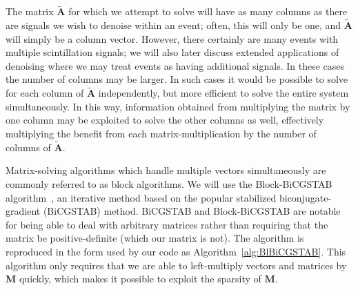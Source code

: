 The matrix $\mathbf{\widetilde{A}}$ for which we attempt to solve will have as many columns as there are signals we wish to denoise within an event; often, this will only be one, and $\mathbf{\widetilde{A}}$ will simply be a column vector.  However, there certainly are many events with multiple scintillation signals; we will also later discuss extended applications of denoising where we may treat events as having additional signals.  In these cases the number of columns may be larger.  In such cases it would be possible to solve for each column of $\mathbf{\widetilde{A}}$ independently, but more efficient to solve the entire system simultaneously.  In this way, information obtained from multiplying the matrix by one column may be exploited to solve the other columns as well, effectively multiplying the benefit from each matrix-multiplication by the number of columns of $\mathbf{\widetilde{A}}$.

Matrix-solving algorithms which handle multiple vectors simultaneously are commonly referred to as block algorithms.  We will use the Block-BiCGSTAB algorithm~\cite{BlBiCGSTAB}, an iterative method based on the popular stabilized biconjugate-gradient (BiCGSTAB) method.  BiCGSTAB and Block-BiCGSTAB are notable for being able to deal with arbitrary matrices rather than requiring that the matrix be positive-definite (which our matrix is not).  The algorithm is reproduced in the form used by our code as Algorithm~\ref{alg:BlBiCGSTAB}.  This algorithm only requires that we are able to left-multiply vectors and matrices by $\mathbf{M}$ quickly, which makes it possible to exploit the sparsity of $\mathbf{M}$.


